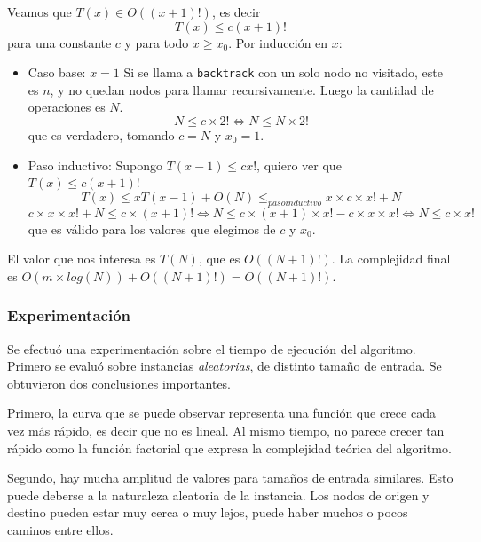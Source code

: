 Veamos que $T(x) \in O((x+1)!)$, es decir
\[
    T(x) \leq c(x+1)!
\]
para una constante $c$ y para todo $x \geq x_0$. Por inducción en $x$:
\begin{itemize}
    \item Caso base: $x=1$
        Si se llama a \texttt{backtrack} con un solo nodo no visitado, este es $n$, y no quedan nodos para llamar recursivamente. Luego la cantidad de operaciones es $N$.
        \[
            N \leq c \times 2! \Leftrightarrow N \leq N \times 2!
        \]
        que es verdadero, tomando $c = N$ y $x_0 = 1$.
    \item Paso inductivo: Supongo $T(x-1) \leq cx!$, quiero ver que $T(x) \leq c(x+1)!$
        \[
            T(x) \leq x T(x-1) + O(N) \leq_{paso inductivo} x \times c \times x! + N
        \]
        \[
            c \times x \times x! + N \leq c \times (x+1)! \Leftrightarrow N \leq c \times (x+1) \times x! - c \times x \times x! \Leftrightarrow N \leq c \times x!
        \]
        que es válido para los valores que elegimos de $c$ y $x_0$.
\end{itemize}

El valor que nos interesa es $T(N)$, que es $O((N+1)!)$. La complejidad final es $O(m \times log(N)) + O((N+1)!) = O((N+1)!)$.

\newpage
\subsubsection{Experimentación}

Se efectuó una experimentación sobre el tiempo de ejecución del algoritmo. Primero se evaluó sobre instancias \textit{aleatorias}, de distinto tamaño de entrada. Se obtuvieron dos conclusiones importantes.

Primero, la curva que se puede observar representa una función que crece cada vez más rápido, es decir que no es lineal. Al mismo tiempo, no parece crecer tan rápido como la función factorial que expresa la complejidad teórica del algoritmo.

Segundo, hay mucha amplitud de valores para tamaños de entrada similares. Esto puede deberse a la naturaleza aleatoria de la instancia. Los nodos de origen y destino pueden estar muy cerca o muy lejos, puede haber muchos o pocos caminos entre ellos.

